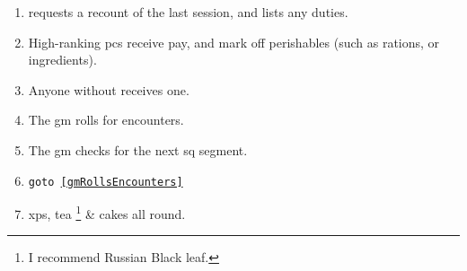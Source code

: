 
\begin{enumerate}
  \item
   requests a recount of the last session, and lists any duties.
  \item
  High-ranking \Glspl{pc} receive pay, and mark off perishables (such as rations, or \glspl{ingredient}).
  \item
  Anyone without  receives one.
  \label{newPC}
  \item
  The \gls{gm} rolls for encounters.
  \label{gmRollsEncounters}
  \item
  The \gls{gm} checks for the next \gls{sq} \gls{segment}.
  \item
  {\tt goto \ref{gmRollsEncounters}}
  \item
  \Glspl{xp}, tea%
  \ifodd\value{r3}\footnote{I recommend Russian Black leaf.}\fi
  \& cakes all round.
\end{enumerate}

